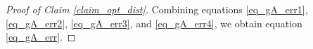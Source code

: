 \begin{proof}[Proof of Claim \ref{claim_opt_dist}]
	Combining equations \eqref{eq_gA_err1}, \eqref{eq_gA_err2}, \eqref{eq_gA_err3}, and \eqref{eq_gA_err4}, we obtain equation \eqref{eq_gA_err}.


\end{proof}
